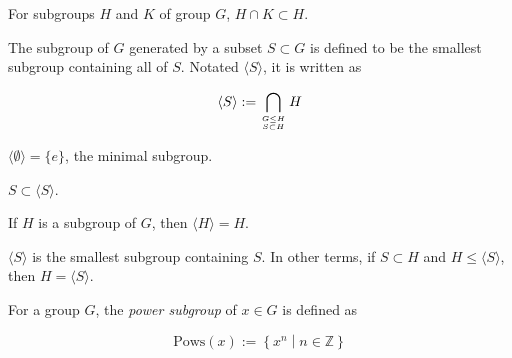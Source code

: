 \begin{theorem}
    \label{theorem : le_intersect_self}
    \leanok
    For subgroups $H$ and $K$ of group $G$, $H \cap K \subset H$.
\end{theorem}

\begin{definition}
    \label{definition : Generate}
    \leanok
    The subgroup of $G$ generated by a subset $S \subset G$ is defined to be the smallest subgroup containing all of $S$. Notated $\langle S \rangle$, it is written as

    \begin{equation*}
        \langle S \rangle := \bigcap_{\genfrac{}{}{0pt}{}{G \le H}{S \subset H}} H
    \end{equation*}
\end{definition}

\begin{theorem}
    \label{theorem : Generate_empty}
    \leanok
    $\langle \emptyset \rangle = \{e\}$, the minimal subgroup.
\end{theorem}

\begin{theorem}
    \label{theorem : Generate_contain_set}
    \leanok
    $S \subset \langle S \rangle$.
\end{theorem}

\begin{theorem}
    \label{theorem : Generate_self_eq_self}
    \leanok
    If $H$ is a subgroup of $G$, then $\langle H \rangle = H$.
\end{theorem}

\begin{theorem}
    \label{theorem : Generate_smallest_closure}
    \leanok
    $\langle S \rangle$ is the smallest subgroup containing $S$. In other terms, if $S \subset H$ and $H \le \langle S \rangle$, then $H = \langle S \rangle$.
\end{theorem}

\begin{definition}
    \label{definition : Pows}
    \leanok
    For a group $G$, the \textit{power subgroup} of $x \in G$ is defined as

    $$\text{Pows}(x) := \left\{ x^n \middle| n \in \mathbb{Z} \right\}$$
\end{definition}

